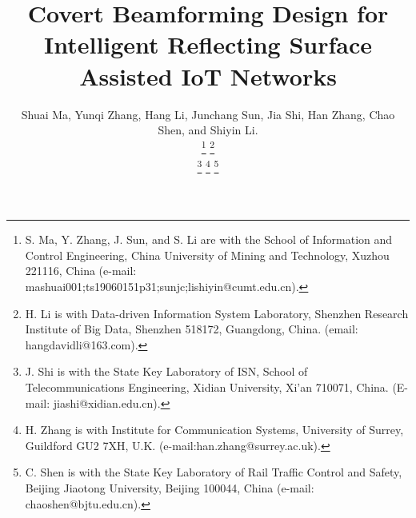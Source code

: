 \documentclass[10pt,journal,letterpaper,twocolumn,twoside]{IEEEtran} %
\begin{document}
%

\title{   Covert   Beamforming Design  for Intelligent Reflecting Surface  Assisted IoT  Networks}
  \author{Shuai Ma, Yunqi Zhang, Hang Li, Junchang Sun, Jia Shi,  Han Zhang, Chao Shen, and Shiyin Li.

%



\thanks{S. Ma, Y. Zhang, J. Sun,  and S. Li are with the School of Information and Control   Engineering, China
University of Mining and Technology, Xuzhou 221116,
China (e-mail: {mashuai001;ts19060151p31;sunjc;lishiyin}@cumt.edu.cn).}
\thanks{H. Li is with Data-driven Information System Laboratory, Shenzhen Research Institute of Big Data, Shenzhen 518172, Guangdong, China. (email: hangdavidli@163.com).}

\thanks{J. Shi is with the State Key Laboratory of ISN, School of Telecommunications Engineering, Xidian University, Xi'an 710071, China. (E-mail: jiashi@xidian.edu.cn).}
\thanks{H. Zhang is with Institute for Communication Systems, University of Surrey, Guildford GU2 7XH, U.K. (e-mail:han.zhang@surrey.ac.uk).}
\thanks{C. Shen is with the State Key Laboratory of Rail Traffic Control
and Safety, Beijing Jiaotong University, Beijing 100044, China (e-mail:
chaoshen@bjtu.edu.cn).}
}
\maketitle
\end{document}
